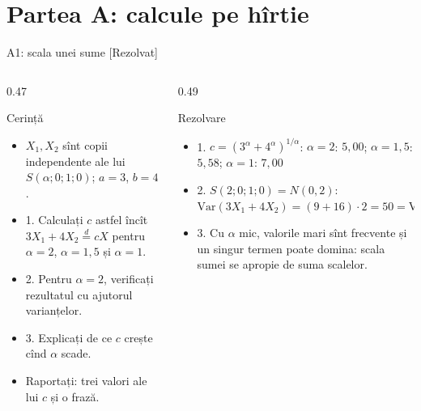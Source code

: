 \section{Partea A: calcule pe hîrtie}

\begin{frame}{A1: scala unei sume [Rezolvat]}
\itemsize{\footnotesize}
\begin{columns}[T]
\begin{column}{0.47\textwidth}
\begin{block}{Cerință}
\begin{itemize}
    \item $X_1, X_2$ sînt copii independente ale lui $S(\alpha; 0; 1; 0)$; $a = 3$, $b = 4$.
    \item 1. Calculați $c$ astfel încît $3X_1 + 4X_2 \overset{d}{=} cX$ pentru $\alpha = 2$, $\alpha = 1{,}5$ și $\alpha = 1$.
    \item 2. Pentru $\alpha = 2$, verificați rezultatul cu ajutorul varianțelor.
    \item 3. Explicați de ce $c$ crește cînd $\alpha$ scade.
    \item Raportați: trei valori ale lui $c$ și o frază.
\end{itemize}
\end{block}
\end{column}
\begin{column}{0.49\textwidth}
\begin{exampleblock}{Rezolvare}
\begin{itemize}
    \item 1. $c = (3^\alpha + 4^\alpha)^{1/\alpha}$: $\alpha = 2$: $5{,}00$; $\alpha = 1{,}5$: $5{,}58$; $\alpha = 1$: $7{,}00$
    \item 2. $S(2; 0; 1; 0) = N(0, 2)$: $\mathrm{Var}(3X_1 + 4X_2) = (9 + 16) \cdot 2 = 50 = \mathrm{Var}(5X)$
    \item 3. Cu $\alpha$ mic, valorile mari sînt frecvente și un singur termen poate domina: scala sumei se apropie de suma scalelor.
\end{itemize}
\end{exampleblock}
\end{column}
\end{columns}
\end{frame}

